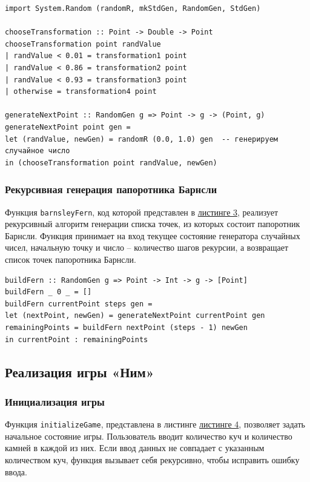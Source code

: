 \documentclass[11pt,a4paper,final]{article} %
\begin{document}
\newpage
\begin{lstlisting}[caption={Код функций для генераций новых точек в папоротнике Барнсли.}, label={lst:genDot}]
import System.Random (randomR, mkStdGen, RandomGen, StdGen)
	
chooseTransformation :: Point -> Double -> Point
chooseTransformation point randValue
| randValue < 0.01 = transformation1 point
| randValue < 0.86 = transformation2 point
| randValue < 0.93 = transformation3 point
| otherwise = transformation4 point

generateNextPoint :: RandomGen g => Point -> g -> (Point, g)
generateNextPoint point gen = 
let (randValue, newGen) = randomR (0.0, 1.0) gen  -- генерируем случайное число
in (chooseTransformation point randValue, newGen)
\end{lstlisting}

\subsubsection{Рекурсивная генерация папоротника Барнсли}

Функция \texttt{barnsleyFern}, код которой представлен в \hyperref[lst:barnsleyFern]{листинге 3}, реализует рекурсивный алгоритм генерации списка точек, из которых состоит папоротник Барнсли. Функция принимает на вход текущее состояние генератора случайных чисел, начальную точку и число -- количество шагов рекурсии, а возвращает список точек папоротника Барнсли.

\begin{lstlisting}[caption={Код функции для построения папоротника Барнсли.}, label={lst:barnsleyFern}]
buildFern :: RandomGen g => Point -> Int -> g -> [Point]
buildFern _ 0 _ = []
buildFern currentPoint steps gen =
let (nextPoint, newGen) = generateNextPoint currentPoint gen
remainingPoints = buildFern nextPoint (steps - 1) newGen
in currentPoint : remainingPoints        
\end{lstlisting}


\subsection{Реализация игры «Ним»}

\subsubsection{Инициализация игры}

Функция \texttt{initializeGame}, представлена в листинге \hyperref[lst:init]{листинге 4}, позволяет задать начальное состояние игры. Пользователь вводит количество куч и количество камней в каждой из них. Если ввод данных не совпадает с указанным количеством куч, функция вызывает себя рекурсивно, чтобы исправить ошибку ввода.
\end{document}
